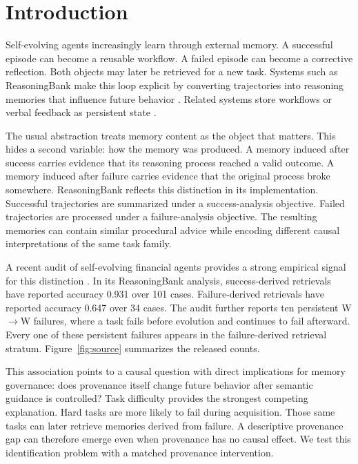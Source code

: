 \section{Introduction}
Self-evolving agents increasingly learn through external memory. A successful episode can become a reusable workflow. A failed episode can become a corrective reflection. Both objects may later be retrieved for a new task. Systems such as ReasoningBank make this loop explicit by converting trajectories into reasoning memories that influence future behavior \citep{ouyang2026reasoningbank}. Related systems store workflows or verbal feedback as persistent state \citep{wang2024awm,shinn2023reflexion}.

The usual abstraction treats memory content as the object that matters. This hides a second variable: how the memory was produced. A memory induced after success carries evidence that its reasoning process reached a valid outcome. A memory induced after failure carries evidence that the original process broke somewhere. ReasoningBank reflects this distinction in its implementation. Successful trajectories are summarized under a success-analysis objective. Failed trajectories are processed under a failure-analysis objective. The resulting memories can contain similar procedural advice while encoding different causal interpretations of the same task family.

A recent audit of self-evolving financial agents provides a strong empirical signal for this distinction \citep{li2026audit}. In its ReasoningBank analysis, success-derived retrievals have reported accuracy 0.931 over 101 cases. Failure-derived retrievals have reported accuracy 0.647 over 34 cases. The audit further reports ten persistent W$\rightarrow$W failures, where a task fails before evolution and continues to fail afterward. Every one of these persistent failures appears in the failure-derived retrieval stratum. Figure~\ref{fig:source} summarizes the released counts.

This association points to a causal question with direct implications for memory governance: does provenance itself change future behavior after semantic guidance is controlled? Task difficulty provides the strongest competing explanation. Hard tasks are more likely to fail during acquisition. Those same tasks can later retrieve memories derived from failure. A descriptive provenance gap can therefore emerge even when provenance has no causal effect. We test this identification problem with a matched provenance intervention.

